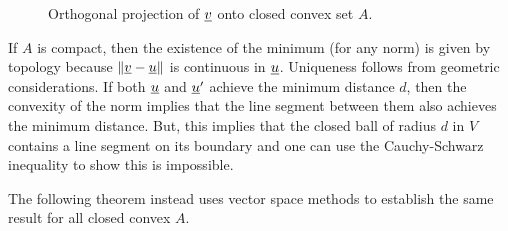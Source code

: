 \begin{figure}
\centering
{}
\caption{Orthogonal projection of $\underline{v}$ onto closed convex set $A$. \label{fig:pocs}}
\end{figure}

\begin{remark}
If $A$ is compact, then the existence of the minimum (for any norm) is given by topology because $\| \underline{v} - \underline{u} \|$ is continuous in $\underline{u}$.
Uniqueness follows from geometric considerations.
If both $\underline{u}$ and $\underline{u}'$ achieve the minimum distance $d$, then the convexity of the norm implies that the line segment between them also achieves the minimum distance. 
But, this implies that the closed ball of radius $d$ in $V$ contains a line segment on its boundary and one can use the Cauchy-Schwarz inequality to show this is impossible.
\end{remark}

The following theorem instead uses vector space methods to establish the same result for all closed convex $A$.

